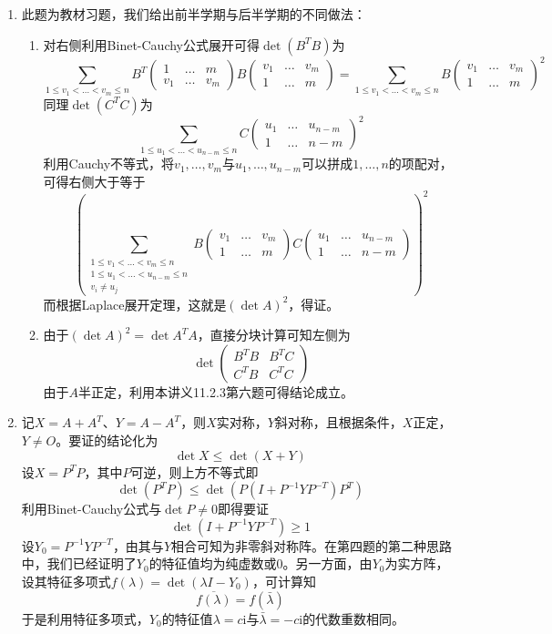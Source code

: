 \documentclass[a4paper,UTF8,fontset=windows]{ctexart}
\newcommand*{\ir}{\mathrm{i}}
\begin{document}
\begin{enumerate}
\begin{enumerate}
        \item
        此题为教材习题，我们给出前半学期与后半学期的不同做法：
        \begin{enumerate}
            \item 对右侧利用Binet-Cauchy公式展开可得$\det(B^TB)$为
            $$\sum_{1\le v_1<\dots<v_m\le n}B^T\begin{pmatrix}1&\dots&m\\v_1&\dots&v_m\end{pmatrix}B\begin{pmatrix}v_1&\dots&v_m\\1&\dots&m\end{pmatrix}=\sum_{1\le v_1<\dots<v_m\le n}B\begin{pmatrix}v_1&\dots&v_m\\1&\dots&m\end{pmatrix}^2$$
            同理$\det(C^TC)$为
            $$\sum_{1\le u_1<\dots<u_{n-m}\le n}C\begin{pmatrix}u_1&\dots&u_{n-m}\\1&\dots&n-m\end{pmatrix}^2$$
            利用Cauchy不等式，将$v_1,\dots,v_m$与$u_1,\dots,u_{n-m}$可以拼成$1,\dots,n$的项配对，可得右侧大于等于
            $$\left(\sum_{\substack{1\le v_1<\dots<v_m\le n\\1\le u_1<\dots<u_{n-m}\le n\\v_i\ne u_j}}B\begin{pmatrix}v_1&\dots&v_m\\1&\dots&m\end{pmatrix}C\begin{pmatrix}u_1&\dots&u_{n-m}\\1&\dots&n-m\end{pmatrix}\right)^2$$
            而根据Laplace展开定理，这就是$(\det A)^2$，得证。

            \item 由于$(\det A)^2=\det A^TA$，直接分块计算可知左侧为
            $$\det\begin{pmatrix}B^TB&B^TC\\C^TB&C^TC\end{pmatrix}$$
            由于$A$半正定，利用本讲义11.2.3第六题可得结论成立。
        \end{enumerate}
        
        \item
        记$X=A+A^T$、$Y=A-A^T$，则$X$实对称，$Y$斜对称，且根据条件，$X$正定，$Y\ne O$。要证的结论化为
        $$\det X\le\det(X+Y)$$
        设$X=P^TP$，其中$P$可逆，则上方不等式即
        $$\det(P^TP)\le\det(P(I+P^{-1}YP^{-T})P^T)$$
        利用Binet-Cauchy公式与$\det P\ne 0$即得要证
        $$\det(I+P^{-1}YP^{-T})\ge1$$
        设$Y_0=P^{-1}YP^{-T}$，由其与$Y$相合可知为非零斜对称阵。在第四题的第二种思路中，我们已经证明了$Y_0$的特征值均为纯虚数或0。另一方面，由$Y_0$为实方阵，设其特征多项式$f(\lambda)=\det(\lambda I-Y_0)$，可计算知
        $$\overline{f(\lambda)}=f(\bar\lambda)$$
        于是利用特征多项式，$Y_0$的特征值$\lambda=c\ir$与$\bar\lambda=-c\ir$的代数重数相同。


\end{enumerate}
\end{enumerate}
\end{document}
